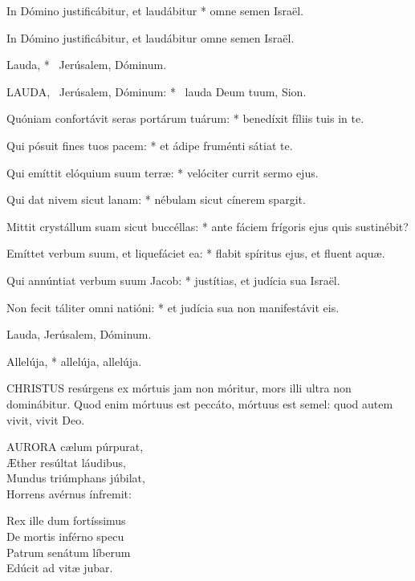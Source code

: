 In Dómino justificábitur, et laudábitur * omne semen Israël.

 In Dómino justificábitur, et laudábitur omne semen Israël.

 Lauda, * \textdagger\ Jerúsalem, Dóminum. \textdaggerdbl


\lettrine[lines=2]{L}{AUDA}, \textdagger\ Jerúsalem, Dóminum: * \textdaggerdbl\ lauda Deum tuum, Sion.

Quóniam confortávit seras portárum tuárum: * benedíxit fíliis tuis in te.

Qui pósuit fines tuos pacem: * et ádipe fruménti sátiat te.

Qui emíttit elóquium suum terræ: * velóciter currit sermo ejus.

Qui dat nivem sicut lanam: * nébulam sicut cínerem spargit.

Mittit crystállum suam sicut buccéllas: * ante fáciem frígoris ejus quis sustinébit?

Emíttet verbum suum, et liquefáciet ea: * flabit spíritus ejus, et fluent aquæ.

Qui annúntiat verbum suum Jacob: * justítias, et judícia sua Israël.

Non fecit táliter omni natióni: * et judícia sua non manifestávit eis.


 Lauda, Jerúsalem, Dóminum.


 Allelúja, * allelúja, allelúja.



\lettrine[lines=2]{C}{HRISTUS} resúrgens ex mórtuis jam non móritur, mors illi ultra non dominábitur. Quod enim mórtuus est peccáto, mórtuus est semel: quod autem vivit, vivit Deo.


\lettrine[lines=2]{A}{URORA} cælum púrpurat,\\
Æther resúltat láudibus,\\
Mundus triúmphans júbilat,\\
Horrens avérnus ínfremit:

Rex ille dum fortíssimus\\
De mortis inférno specu\\
Patrum senátum líberum\\
Edúcit ad vitæ jubar.

